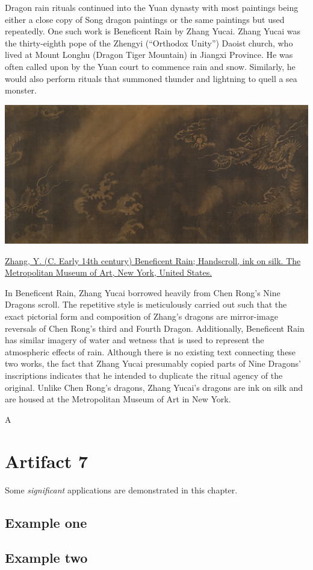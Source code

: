 \documentclass[
]{book}
\begin{document}
Dragon rain rituals continued into the Yuan dynasty with most paintings being either a close copy of Song dragon paintings or the same paintings but used repeatedly. One such work is Beneficent Rain by Zhang Yucai. Zhang Yucai was the thirty-eighth pope of the Zhengyi (``Orthodox Unity'') Daoist church, who lived at Mount Longhu (Dragon Tiger Mountain) in Jiangxi Province. He was often called upon by the Yuan court to commence rain and snow. Similarly, he would also perform rituals that summoned thunder and lightning to quell a sea monster.

\includegraphics[width=1.2\textwidth,height=\textheight]{images/beneficent_Rain.png}

\href{https://www.metmuseum.org/art/collection/search/40454}{Zhang, Y. (C. Early 14th century) Beneficent Rain; Handscroll, ink on silk. The Metropolitan Museum of Art, New York, United States.}

In Beneficent Rain, Zhang Yucai borrowed heavily from Chen Rong's Nine Dragons scroll. The repetitive style is meticulously carried out such that the exact pictorial form and composition of Zhang's dragons are mirror-image reversals of Chen Rong's third and Fourth Dragon. Additionally, Beneficent Rain has similar imagery of water and wetness that is used to represent the atmospheric effects of rain. Although there is no existing text connecting these two works, the fact that Zhang Yucai presumably copied parts of Nine Dragons' inscriptions indicates that he intended to duplicate the ritual agency of the original. Unlike Chen Rong's dragons, Zhang Yucai's dragons are ink on silk and are housed at the Metropolitan Museum of Art in New York.

A

\hypertarget{artifact7}{%
\chapter*{Artifact 7}\label{artifact7}}

Some \emph{significant} applications are demonstrated in this chapter.

\hypertarget{example-one}{%
\section{Example one}\label{example-one}}

\hypertarget{example-two}{%
\section{Example two}\label{example-two}}

  
\end{document}
